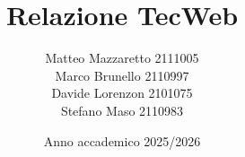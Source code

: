 \documentclass[10pt,oneside,a4paper]{article}
\title{Relazione TecWeb}
\author{Matteo Mazzaretto 2111005\\
	Marco Brunello 2110997\\
	Davide Lorenzon 2101075\\
	Stefano Maso 2110983}
\date{Anno accademico 2025/2026}
\begin{document}
	\maketitle
	\begin{center}
		\renewcommand{\contentsname}{Indice}
		\tableofcontents
	\end{center}
	\newpage
	\setcounter{page}{1}
\end{document}
